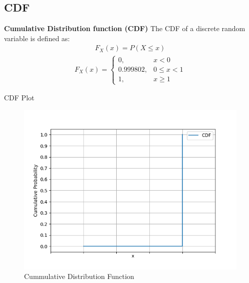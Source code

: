 \documentclass{beamer}
\providecommand{\brak}[1]{\ensuremath{\left(#1\right)}}
\theoremstyle{remark}
\numberwithin{equation}{section}
\begin{document}
\subsection{CDF}
\begin{frame}{\textbf{Cumulative Distribution function (CDF)}}
    The CDF of a discrete random variable is defined as:\\
    \begin{align}
    	F_X\brak{x} = P\brak{X \leq x}
    \end{align}
    \begin{align}
            F_X\brak{x} = \begin{cases}
                    0, & x < 0 \\
                    0.999802, & 0 \leq x < 1  \\
                    1, & x \geq 1
            \end{cases}
    \end{align}
\end{frame}

\begin{frame}{CDF Plot}
    \begin{figure}
        \centering
        \includegraphics[width=0.8\linewidth]{figs/cdf.png}
        \caption{Cummulative Distribution Function}
        \label{fig:enter-label}
    \end{figure}
\end{frame}
\end{document}
